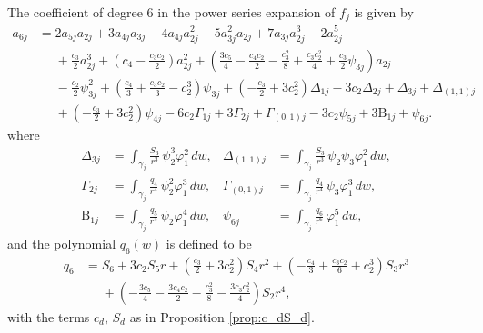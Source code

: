 \begin{proposition}\label{prop:sixthvar}
The coefficient of degree $6$ in the power series expansion of $f_j$ is given by
\begin{align*}
a_{6j} 	&=	2a_{5j}a_{2j}+3a_{4j}a_{3j}-4a_{4j}a_{2j}^2-5a_{3j}^2a_{2j}+7a_{3j}a_{2j}^3-2a_{2j}^5 \\
&\phantom{=}	+\frac{c_3}{2}a_{2j}^3+\left(c_4-\frac{c_3c_2}{2}\right)a_{2j}^2+\left(\frac{3c_5}{4}-\frac{c_4c_2}{2}-\frac{c_3^2}{8}+\frac{c_3c_2^2}{4}+\frac{c_3}{2}\psi_{3j}\right)a_{2j} \\
&\phantom{=}	-\frac{c_2}{2}\psi_{3j}^2+\left(\frac{c_4}{3}+\frac{c_3c_2}{3}-c_2^3\right)\psi_{3j}+\left(-\frac{c_3}{2}+3c_2^2\right)\Delta_{1j}-3c_2\Delta_{2j}+\Delta_{3j}+\Delta_{(1,1)j} \\
&\phantom{=}	+\left(-\frac{c_3}{2}+3c_2^2\right)\psi_{4j}-6c_2\Gamma_{1j}+3\Gamma_{2j}+\Gamma_{(0,1)j}-3c_2\psi_{5j}+3\mathrm{B}_{1j}+\psi_{6j}.
\end{align*}
where
\begin{align*}
 \Delta_{3j} &= \int_{\gamma_j}\frac{S_3}{r^3}\,\psi_2^3\varphi_1^2\,dw, & 
 \Delta_{(1,1)j} &= \int_{\gamma_j}\frac{S_3}{r^3}\,\psi_2\psi_3\varphi_1^2\,dw, \\
 \Gamma_{2j} &= \int_{\gamma_j}\frac{q_4}{r^4}\,\psi_2^2\varphi_1^3\,dw, & 
 \Gamma_{(0,1)j} &= \int_{\gamma_j}\frac{q_4}{r^4}\,\psi_3\varphi_1^3\,dw, \\
 \mathrm{B}_{1j} &= \int_{\gamma_j}\frac{q_5}{r^5}\,\psi_2\varphi_1^4\,dw, &
 \psi_{6j} &= \int_{\gamma_j}\frac{q_6}{r^6}\,\varphi_1^5\,dw, 
\end{align*}
and the polynomial $q_6(w)$ is defined to be
\begin{align*}
q_6 	&= 	S_6+3c_2S_5r+\left(\frac{c_3}{2}+3c_2^2\right)S_4r^2+\left(-\frac{c_4}{3}+\frac{c_3c_2}{6}+c_2^3\right)S_3r^3 \\
&\phantom{=}	+\left(-\frac{3c_5}{4}-\frac{3c_4c_2}{2}-\frac{c_3^2}{8}-\frac{3c_3c_2^2}{4}\right)S_2r^4,
\end{align*}
with the terms $c_d$, $S_d$ as in Proposition \textnormal{\ref{prop:c_dS_d}}.
\end{proposition}

